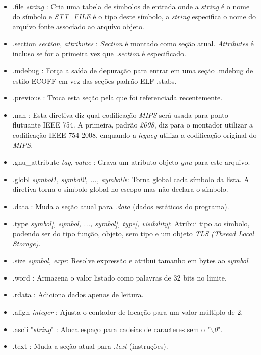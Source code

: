 \documentclass[12pt]{article}
\begin{document}
\begin{itemize}

\item .file \textit{string} : Cria uma tabela de símbolos de entrada onde a \textit{string} é o nome do símbolo e \textit{STT\_FILE} é o tipo deste símbolo, a \textit{string} especifica o nome do arquivo fonte associado ao arquivo objeto.
\item .section \textit{section}, \textit{attributes} : \textit{Section} é montado como seção atual. \textit{Attributes} é incluso se for a primeira vez que \textit{.section} é especificado.
\item .mdebug : Força a saída de depuração para entrar em uma seção .mdebug de estilo ECOFF em vez das seções padrão ELF .stabs.
\item .previous : Troca esta seção pela que foi referenciada recentemente.
\item .nan : Esta diretiva diz qual codificação \textit{MIPS} será usada para ponto flutuante IEEE 754. A primeira, padrão \textit{2008}, diz para o montador utilizar a codificação IEEE 754-2008, enquando a \textit{legacy} utiliza a codificação original do \textit{MIPS}.
\item .gnu\_attribute \textit{tag}, \textit{value} : Grava um atributo objeto \textit{gnu} para este arquivo.
\item .globl \textit{symbol1, symbol2, ..., symbolN}: Torna global cada símbolo da lista. A diretiva torna o símbolo global no escopo mas não declara o símbolo.
\item .data : Muda a seção atual para \textit{.data} (dados estáticos do programa).
\item .type \textit{symbol[, symbol, ..., symbol], type[, visibility]}: Atribui tipo ao símbolo, podendo ser do tipo função, objeto, sem tipo e um objeto \textit{TLS (Thread Local Storage)}.
\item .size \textit{symbol, expr}: Resolve expressão e atribui tamanho em bytes ao \textit{symbol}.
\item .word : Armazena o valor listado como palavras de 32 bits no limite.
\item .rdata : Adiciona dados apenas de leitura.
\item .align \textit{integer} : Ajusta o contador de locação para um valor múltiplo de 2.
\item .ascii "\textit{string}" : Aloca espaço para cadeias de caracteres sem o "\textit{$\backslash$0}".
\item .text : Muda a seção atual para \textit{.text} (instruções).

\end{itemize}
\end{document}
